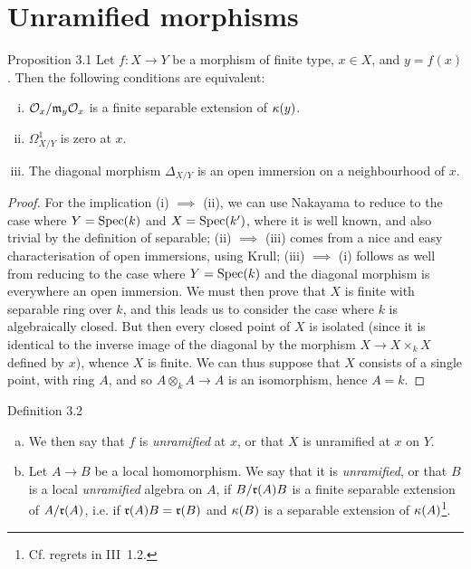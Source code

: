 \section{Unramified morphisms}
\label{I.3}

\begin{itenv}{Proposition 3.1}
  Let $f\colon X\to Y$ be a morphism of finite type, $x\in X$, and $y=f(x)$.
  Then the following conditions are equivalent:
  \begin{enumerate}[(i)]
    \item $\cal{O}_x/\frak{m}_y\cal{O}_x$ is a finite separable extension of $\kres(y)$.
    \item $\Omega_{X/Y}^1$ is zero at $x$.
    \item The diagonal morphism $\Delta_{X/Y}$ is an open immersion on a neighbourhood of $x$.
  \end{enumerate}
\end{itenv}

\begin{proof}
  For the implication (i) $\implies$ (ii), we can use Nakayama to reduce to the case where $Y=\Spec(k)$ and $X=\Spec(k')$, where it is well known, and also trivial by the definition of separable;
  (ii) $\implies$ (iii) comes from a nice and easy characterisation of open immersions, using Krull;
  (iii) $\implies$ (i) follows as well from reducing to the case where $Y=\Spec(k)$ and the diagonal morphism is everywhere an open immersion.
  We must then prove that $X$ is finite with separable ring over $k$, and this leads us to consider the case where $k$ is algebraically closed.
  But then every closed point of $X$ is isolated (since it is identical to the inverse image of the diagonal by the morphism $X\to X\times_k X$ defined by $x$), whence $X$ is finite.
  We can thus suppose that $X$ consists of a single point, with ring $A$, and so $A\otimes_k A\to A$ is an isomorphism, hence $A=k$.
\end{proof}

\begin{rmenv}{Definition 3.2}
  \begin{enumerate}[(a)]
    \item We then say that $f$ is \emph{unramified} at $x$, or that $X$ is unramified at $x$ on $Y$.
    \item Let $A\to B$ be a local homomorphism.
        We say that it is \emph{unramified}, or that $B$ is a local \emph{unramified} algebra on $A$, if $B/\frak{r}(A)B$ is a finite separable extension of $A/\frak{r}(A)$, i.e. if $\frak{r}(A)B=\frak{r}(B)$ and $\kres(B)$ is a separable extension of $\kres(A)$\footnote{Cf. regrets in III~1.2.}.
  \end{enumerate}
\end{rmenv}

